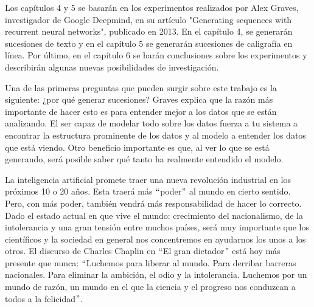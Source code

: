 \vspace{1em}

Los capítulos 4 y 5 se basarán en los experimentos realizados por Alex Graves, investigador de Google Deepmind, en su artículo "Generating sequences with recurrent neural networks", publicado en 2013. En el capítulo 4, se generarán sucesiones de texto y en el capítulo 5 se generarán sucesiones de caligrafía en línea. Por último, en el capítulo 6 se harán conclusiones sobre los experimentos y describirán algunas nuevas posibilidades de investigación. \cite{DBLP:journals/corr/Graves13}

\vspace{1em}

Una de las primeras preguntas que pueden surgir sobre este trabajo es la siguiente: ¿por qué generar sucesiones? Graves explica que la razón más importante de hacer esto es para entender mejor a los datos que se están analizando. El ser capaz de modelar todo sobre los datos fuerza a tu sistema a encontrar la estructura prominente de los datos y al modelo a entender los datos que está viendo. Otro beneficio importante es que, al ver lo que se está generando, será posible saber qué tanto ha realmente entendido el modelo. 
\cite{graves}
\cite{DBLP:journals/corr/Graves13}

\vspace{1em}

La inteligencia artificial promete traer una nueva revolución industrial en los próximos 10 o 20 años. Esta traerá más $``$poder$"$ al mundo en cierto sentido. Pero, con más poder, también vendrá más responsabilidad de hacer lo correcto. Dado el estado actual en que vive el mundo: crecimiento del nacionalismo, de la intolerancia y una gran tensión entre muchos países, será muy importante que los científicos y la sociedad en general nos concentremos en ayudarnos los unos a los otros. El discurso de Charles Chaplin en $``$El gran dictador$"$ está hoy más presente que nunca: $``$Luchemos para liberar al mundo. Para derribar barreras nacionales. Para eliminar la ambición, el odio y la intolerancia. Luchemos por un mundo de razón, un mundo en el que la ciencia y el progreso nos conduzcan a todos a la felicidad$"$.
\cite{goodfellow-et-al-2016}






